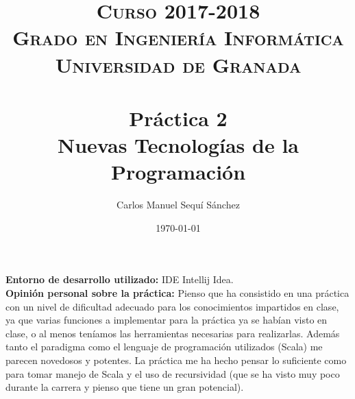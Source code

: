 


\title{	
\normalfont \normalsize 
\textsc{\textbf{Curso 2017-2018} \\ Grado en Ingeniería Informática \\ Universidad de Granada} \\ [25pt] %
\horrule{0.5pt} \\[0.4cm] %
\huge Práctica 2 \\ Nuevas Tecnologías de la Programación %
\horrule{2pt} \\[0.5cm] %
}

\author{Carlos Manuel Sequí Sánchez} %

\date{\normalsize\today} %




\maketitle %
\textbf{Entorno de desarrollo utilizado:} IDE Intellij Idea.\\
\textbf{Opinión personal sobre la práctica:} Pienso que ha consistido en una práctica con un nivel de dificultad adecuado para los conocimientos impartidos en clase, ya que varias funciones a implementar para la práctica ya se habían visto en clase, o al menos teníamos las herramientas necesarias para realizarlas. Además tanto el paradigma como el lenguaje de programación utilizados (Scala) me parecen novedosos y potentes. La práctica me ha hecho pensar lo suficiente como para tomar manejo de Scala y el uso de recursividad (que se ha visto muy poco durante la carrera y pienso que tiene un gran potencial).




